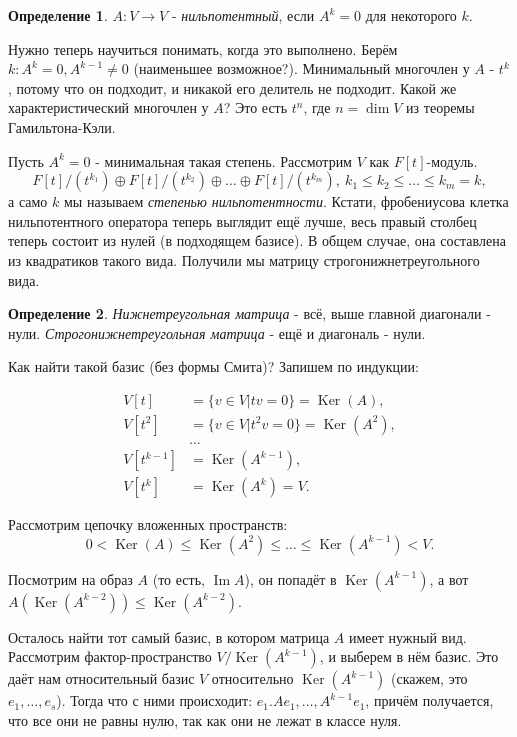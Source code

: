 \documentclass[a4paper,100pt]{article}
\theoremstyle{indented}
\theoremstyle{definition}
\newtheorem{defn}{Определение}
\theoremstyle{remark}
\DeclareMathOperator{\Ker}{Ker}
\DeclareMathOperator{\Imf}{Im}
\begin{document}
\begin{defn}
    $A:V\rightarrow V$ - \textit{нильпотентный}, если $A^k=0$ для некоторого $k$.
\end{defn}

Нужно теперь научиться понимать, когда это выполнено. Берём $k:A^k=0, A^{k-1}\neq 0$ (наименьшее возможное?). Минимальный многочлен у $A$ - $t^k$, потому что он подходит, и никакой его делитель не подходит. Какой же характеристический многочлен у $A$? Это есть $t^n$, где $n=\dim V$ из теоремы Гамильтона-Кэли. \ 

Пусть $A^k=0$ - минимальная такая степень. Рассмотрим $V$ как $F[t]$-модуль.
\[
F[t]/(t^{k_1})\oplus F[t]/(t^{k_2})\oplus\ldots\oplus F[t]/(t^{k_m}), \: k_1\leq k_2\leq\ldots\leq k_m=k,
\]
а само $k$ мы называем \textit{степенью нильпотентности}. Кстати, фробениусова клетка нильпотентного оператора теперь выглядит ещё лучше, весь правый столбец теперь состоит из нулей (в подходящем базисе). В общем случае, она составлена из квадратиков такого вида. Получили мы матрицу строгонижнетреугольного вида.

\begin{defn}
    \textit{Нижнетреугольная матрица} - всё, выше главной диагонали - нули. \textit{Строгонижнетреугольная матрица} - ещё и диагональ - нули.
\end{defn}

Как найти такой базис (без формы Смита)? Запишем по индукции:

\begin{align*}
    V[t] & =\{v\in V \vert tv=0\}=\Ker (A),  \\ 
    V[t^2] & =\{v\in V \vert t^2v=0\}=\Ker (A^2),\\
    &\dots \\
    V[t^{k-1}] & =\Ker (A^{k-1}),\\
    V[t^k] & =\Ker (A^k) = V.
\end{align*}

Рассмотрим цепочку вложенных пространств:
\[
    0<\Ker(A)\leq \Ker(A^2)\leq\ldots\leq\Ker(A^{k-1})<V.
\]

Посмотрим на образ $A$ (то есть, $\Imf A$), он попадёт в $\Ker (A^{k-1})$, а вот $A(\Ker(A^{k-2}))\leq\Ker(A^{k-2})$. \ 

Осталось найти тот самый базис, в котором матрица $A$ имеет нужный вид. Рассмотрим фактор-пространство $V/\Ker(A^{k-1})$, и выберем в нём базис. Это даёт нам относительный базис $V$ относительно $\Ker (A^{k-1})$ (скажем, это $e_1, \ldots, e_s$). Тогда что с ними происходит: $e_1. Ae_1, \ldots, A^{k-1}e_1$, причём получается, что все они не равны нулю, так как они не лежат в классе нуля. \ 
\end{document}
